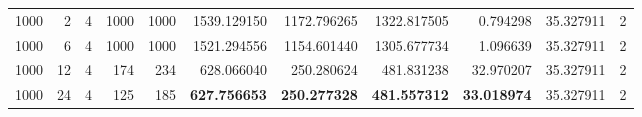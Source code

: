 \begin{table}
\begin{tabular}{rrrrrrrrrrr}
1000 & 2 & 4 & 1000 & 1000 & 1539.129150 & 1172.796265 & 1322.817505 & 0.794298 & 35.327911 & 2 \\
1000 & 6 & 4 & 1000 & 1000 & 1521.294556 & 1154.601440 & 1305.677734 & 1.096639 & 35.327911 & 2 \\
1000 & 12 & 4 & 174 & 234 & 628.066040 & 250.280624 & 481.831238 & 32.970207 & 35.327911 & 2 \\
1000 & 24 & 4 & 125 & 185 & \textbf{627.756653} & \textbf{250.277328} & \textbf{481.557312} & \textbf{33.018974} & 35.327911 & 2 \\
\bottomrule
\end{tabular}
\end{table}

